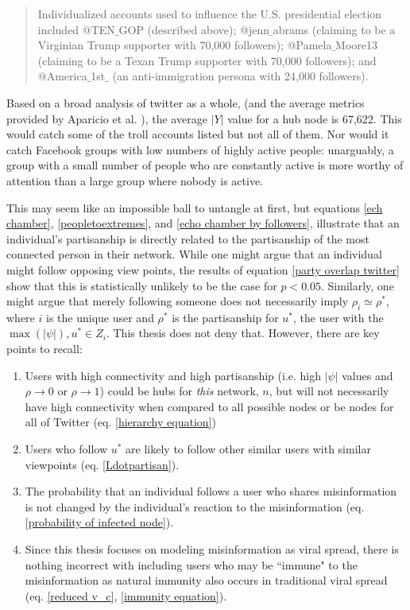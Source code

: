 \documentclass[preprint,review,12pt]{elsarticle}
\begin{document}
\begin{quote}
Individualized accounts used to influence the U.S. presidential election included @TEN$\_$GOP (described above); @jenn$\_$abrams (claiming to be a Virginian Trump supporter with 70,000 followers); @Pamela$\_$Moore13 (claiming to be a Texan Trump supporter with 70,000
followers); and @America$\_$1st$\_$ (an anti-immigration persona with 24,000 followers). \cite{mueller2019mueller}
\end{quote}

Based on a broad analysis of twitter as a whole, (and the average metrics provided by Aparicio et al. \cite{aparicio2015model}), the average $|Y|$ value for a hub node is 67,622. This would catch some of the troll accounts listed but not all of them. Nor would it catch Facebook groups with low numbers of highly active people: unarguably, a group with a small number of people who are constantly active is more worthy of attention than a large group where nobody is active.

This may seem like an impossible ball to untangle at first, but equations \ref{ech chamber}, \ref{peopletoextremes}, and \ref{echo chamber by followers}, illustrate that an individual's partisanship is directly related to the partisanship of the most connected person in their network. While one might argue that an individual might follow opposing view points, the results of equation \ref{party overlap twitter} show that this is statistically unlikely to be the case for $p < 0.05$. Similarly, one might argue that merely following someone does not necessarily imply $\rho_i \simeq \rho^*$, where $i$ is the unique user and $\rho^*$ is the partisanship for $u^*$, the user with the $\max(|\psi|), u^* \in Z_i$. This thesis does not deny that. However, there are key points to recall:
\begin{enumerate}
    \item Users with high connectivity and high partisanship (i.e. high $|\psi|$ values and $\rho \rightarrow 0$ or $\rho \rightarrow 1$) could be hubs for \textit{this} network, $n$, but will not necessarily have high connectivity when compared to all possible nodes or be nodes for all of Twitter (eq. \ref{hierarchy equation}) 
    \item Users who follow $u^*$ are likely to follow other similar users with similar viewpoints (eq. \ref{Ldotpartisan}).
    \item The probability that an individual follows a user who shares misinformation is not changed by the individual's reaction to the misinformation (eq. \ref{probability of infected node}).
    \item Since this thesis focuses on modeling misinformation as viral spread, there is nothing incorrect with including users who may be ``immune" to the misinformation as natural immunity also occurs in traditional viral spread (eq. \ref{reduced v_c}, \ref{immunity equation}).
\end{enumerate}
\end{document}
